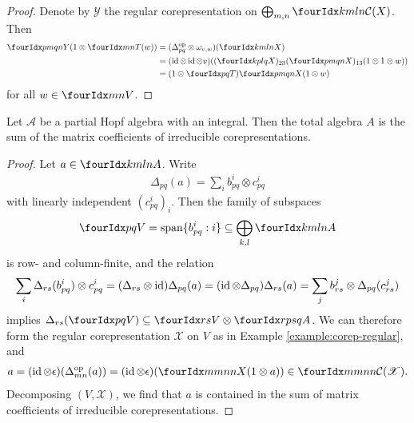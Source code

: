 \begin{proof}
  Denote by $\mathscr{Y}$ the regular corepresentation on
  $\bigoplus_{m,n } \Gr{\mathcal{C}(X)}{k}{l}{m}{n}$. Then
  \begin{align*}
    \label{eq:1}
 \Gr{Y}{p}{q}{m}{n}    (1\otimes \Gru{T}{m}{n}(w)) &= 
(\Delta^{\op}_{pq} \otimes \omega_{v,w})( \Gr{X}{k}{l}{m}{n}) 
\\ & = (\id \otimes \id \otimes
 v)((\Gr{X}{k}{l}{p}{q})_{23}(\Gr{X}{p}{q}{m}{n})_{13}(1 \otimes 1
 \otimes w)) \\ &=(1 \otimes \Gru{T}{p}{q})\Gr{X}{p}{q}{m}{n}(1 \otimes w)
  \end{align*}
for all $w \in \Gru{V}{m}{n}$.
\end{proof}
\begin{Prop} \label{prop:rep-weak-pw} Let $\mathscr{A}$ be a partial
  Hopf algebra with an integral. Then the total algebra $A$ is the sum
  of the matrix coefficients of irreducible corepresentations.
\end{Prop}
\begin{proof} 
  Let $a \in \Gr{A}{k}{l}{m}{n}$. Write
  \begin{align*}
    \Delta_{pq}(a)=\sum_{i} b_{pq}^{i} \otimes c^{i}_{pq}
  \end{align*}
 with linearly independent
  $(c_{pq}^{i})_{i}$. Then the family of subspaces
  \begin{align*}
    \Gru{V}{p}{q} = \mathrm{span}\{b_{pq}^{i} : i \}\subseteq \bigoplus_{k,l}
  \Gr{A}{k}{l}{m}{n}
  \end{align*}
is row- and column-finite, and the relation
  \begin{align*}
 \sum_{i}
    \Delta_{rs}(b^{i}_{pq}) \otimes c^{i}_{pq} =
    (\Delta_{rs} \otimes \operatorname{id})\Delta_{pq}(a) = (\operatorname{id} \otimes
    \Delta_{pq}) \Delta_{rs}(a) = \sum_{j} b^{j}_{rs} \otimes
    \Delta_{pq}(c^{j}_{rs})
  \end{align*}
  implies $\Delta_{rs}(\Gru{V}{p}{q}) \subseteq \Gru{V}{r}{s} \otimes
  \Gr{A}{r}{s}{p}{q}$.  We can therefore form the regular
  corepresentation $\mathscr{X}$ on $V$ as in Example \ref{example:corep-regular}, and
  \begin{align*}
    a = (\id \otimes \epsilon)(\Delta^{\op}_{mn}(a)) =
    (\id \otimes \epsilon)(\Gr{X}{m}{n}{m}{n}(1 \otimes a)) \in
    \Gr{\mathcal{C}(\mathscr{X})}{m}{n}{m}{n}.
  \end{align*}
  Decomposing $(V,\mathscr{X})$, we find that
  $a$ is contained in the sum of matrix coefficients of irreducible
  corepresentations.
\end{proof}


